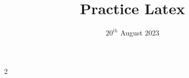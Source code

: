 \documentclass[12pt]{article}
\theoremstyle{definition}
\theoremstyle{definition}
\theoremstyle{remark}
\begin{document}
\title{Practice Latex}
\date{$20^{th}$ August 2023}




\maketitle

2
\end{document}
